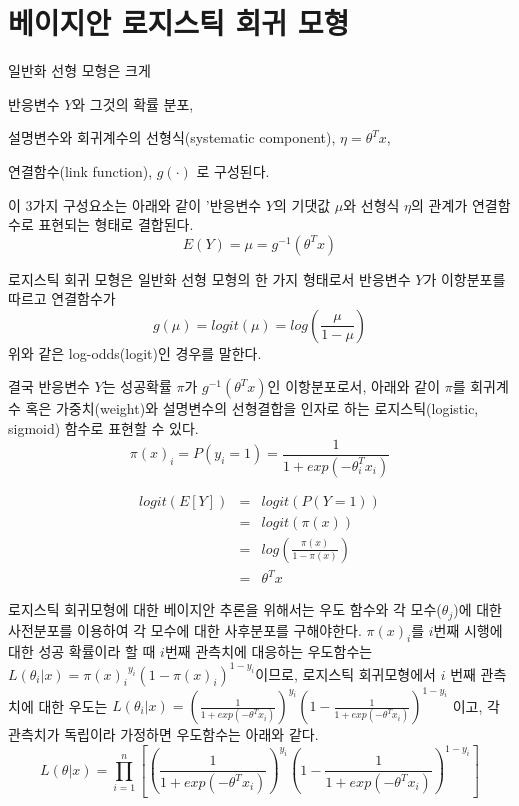\documentclass[oneside,b5paper,11pt]{book} %
\begin{document}
\section{베이지안 로지스틱 회귀 모형}

일반화 선형 모형은 크게 
\begin{inparaenum}[i)]
\item 반응변수 $Y$와 그것의 확률 분포,\quad
\item 설명변수와 회귀계수의 선형식(systematic component), $\eta = \theta^T x$, \quad
\item 연결함수(link function), $g(\cdot)$ 로 구성된다.
\end{inparaenum} 이 3가지 구성요소는 아래와 같이 '반응변수 $Y$의 기댓값 $\mu$와 선형식 $\eta$의 관계가 연결함수로 표현되는 형태로 결합된다.\citep{Agresti1996}
$$E(Y) = \mu = g^{-1}(\theta^T x)$$

 로지스틱 회귀 모형은 일반화 선형 모형의 한 가지 형태로서 반응변수 $Y$가 이항분포를 따르고 연결함수가 
$$
g(\mu) = logit(\mu) =log \left(\frac{\mu}{1-\mu}\right)
$$
위와 같은 log-odds(logit)인 경우를 말한다.

결국 반응변수 $Y$는 성공확률 $\pi$가 $g^{-1}(\theta^T x)$인 이항분포로서, 아래와 같이 $\pi$를 회귀계수 혹은 가중치(weight)와 설명변수의 선형결합을 인자로 하는 로지스틱(logistic, sigmoid) 함수로 표현할 수 있다.
$$
\pi(x)_i = P(y_i=1) = \frac{1}{1+exp(-\theta_i^T x_i)}
$$

\begin{eqnarray}
    {}logit(E[Y])  
  &=& logit(P(Y=1))  \\
  &=& logit(\pi(x))  \\  
  &=& log \left( \frac{\pi(x)}{1-\pi(x)}\right) \\
  &=& \theta^T x
\end{eqnarray}


로지스틱 회귀모형에 대한 베이지안 추론을 위해서는 우도 함수와 각 모수($\theta_{j}$)에 대한 사전분포를 이용하여 각 모수에 대한 사후분포를 구해야한다. $\pi(x)_i$를 $i$번째 시행에 대한 성공 확률이라 할 때 $i$번째 관측치에 대응하는 우도함수는 $L(\theta_i |x) = {\pi(x)_i}^{y_i} (1-\pi(x)_i)^{1-y_i}$이므로, 로지스틱 회귀모형에서 $i$ 번째 관측치에 대한 우도는 $L(\theta_i |x) = {\left(\frac{1}{1+exp(-\theta^T x_i)}\right)}^{y_i} \left(1-{\frac{1}{1+exp(-\theta^T x_i)}}\right)^{1-y_i}$ 이고, 각 관측치가 독립이라 가정하면 우도함수는 아래와 같다.
$$L(\theta|x)= \prod\limits_{i=1}^{n}\left[{\left(\frac{1}{1+exp(-\theta^T x_i)}\right)}^{y_i} \left(1-{\frac{1}{1+exp(-\theta^T x_i)}}\right)^{1-y_i}\right]$$
\end{document}
